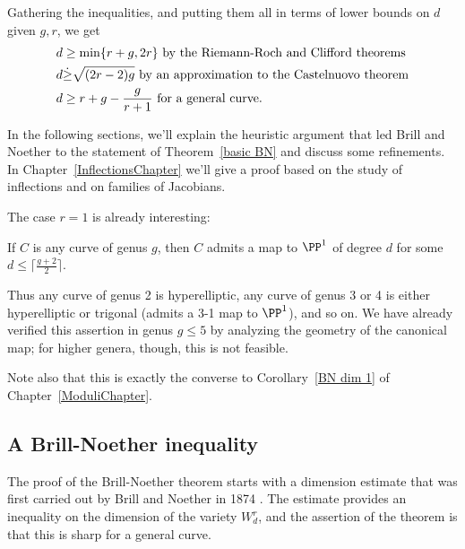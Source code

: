 Gathering the inequalities, and putting them all in terms of lower bounds on $d$ given $g, r$,
we get \goodbreak
\begin{align*}
 d &\geq \min\{r+g, 2r\} \hbox{ by the Riemann-Roch and Clifford theorems}\\
 d &\dot\geq \sqrt{(2r-2)g} \hbox{ by an approximation to the Castelnuovo theorem}\\
 d &\geq r+g-\frac{g}{r+1} \hbox{ for a general curve.}
\end{align*}

In the following sections, we'll explain the heuristic argument that led Brill and Noether to the statement of Theorem~\ref{basic BN} and discuss some refinements.   In Chapter~\ref{InflectionsChapter} we'll give a proof based on the study
of inflections and on families of Jacobians.%

The case $r=1$ is already interesting:

\begin{corollary}
If $C$ is any curve of genus $g$, then $C$ admits a map  to $\PP^1$ of degree $d$ for some $d \leq \lceil \frac{g+2}{2}\rceil$.
\end{corollary}

Thus any curve of genus 2 is hyperelliptic, any curve of genus 3 or 4 is either hyperelliptic or trigonal  (admits a 3-1 map to $\PP^1$), and so on. We have already verified this assertion in genus $g \leq 5$ by analyzing the geometry of the canonical map; for higher genera, though, this is not feasible.

Note also that this is exactly the converse to Corollary~\ref{BN dim 1} of Chapter~\ref{ModuliChapter}.


\subsection{A Brill-Noether inequality}\label{BN by divisors}

The proof of the Brill-Noether theorem starts with a dimension estimate that was first carried out by Brill and Noether in 1874 \cite{Brill-NoetherOriginal}. The estimate provides an inequality on the dimension
of the variety $W^r_d$, and the assertion of the theorem is that this is sharp for a general curve.


